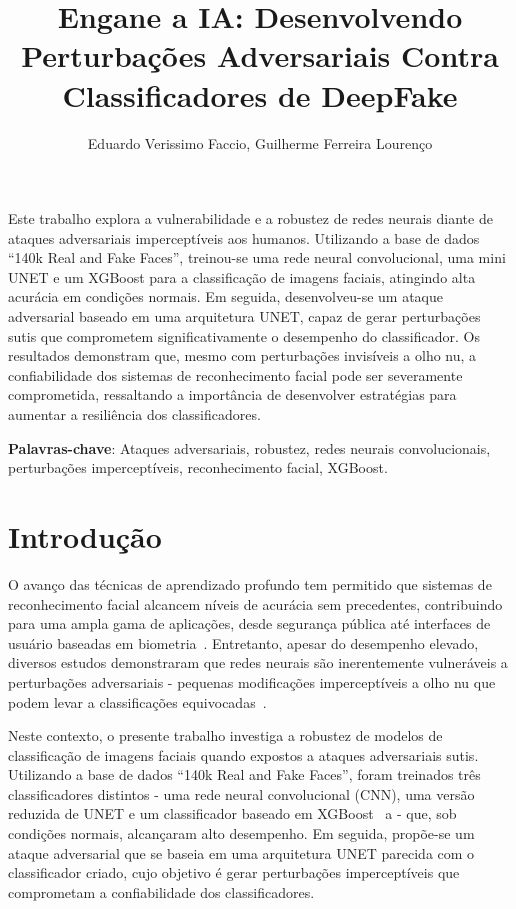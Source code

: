 \documentclass[12pt]{article}
\title{Engane a IA: Desenvolvendo Perturbações Adversariais Contra Classificadores de DeepFake}
\author{Eduardo Verissimo Faccio, Guilherme Ferreira Lourenço}
\begin{document}
\maketitle

\begin{resumo}
    Este trabalho explora a vulnerabilidade e a robustez de redes neurais diante de ataques adversariais
    imperceptíveis aos humanos. Utilizando a base de dados “140k Real and Fake Faces”, treinou-se uma rede
    neural convolucional, uma mini UNET e um XGBoost para a classificação de imagens faciais, atingindo alta
    acurácia em condições normais. Em seguida, desenvolveu-se um ataque adversarial baseado em uma arquitetura
    UNET, capaz de gerar perturbações sutis que comprometem significativamente o desempenho do classificador.
    Os resultados demonstram que, mesmo com perturbações invisíveis a olho nu, a confiabilidade dos sistemas de reconhecimento
    facial pode ser severamente comprometida, ressaltando a importância de desenvolver estratégias para aumentar
    a resiliência dos classificadores.

    \textbf{Palavras-chave}: Ataques adversariais, robustez, redes neurais convolucionais, perturbações imperceptíveis, reconhecimento facial, XGBoost.
\end{resumo}

\section{Introdução}

O avanço das técnicas de aprendizado profundo tem permitido que sistemas de
reconhecimento facial alcancem níveis de acurácia sem precedentes, contribuindo
para uma ampla gama de aplicações, desde segurança pública até interfaces de
usuário baseadas em biometria~\cite{parkhi2015deep}. Entretanto, apesar do
desempenho elevado, diversos estudos demonstraram que redes neurais são
inerentemente vulneráveis a perturbações adversariais - pequenas modificações
imperceptíveis a olho nu que podem levar a classificações
equivocadas~\cite{szegedy2014intriguingpropertiesneuralnetworks,goodfellow2015explainingharnessingadversarialexamples}.

Neste contexto, o presente trabalho investiga a robustez de modelos de
classificação de imagens faciais quando expostos a ataques adversariais sutis.
Utilizando a base de dados ``140k Real and Fake Faces'', foram treinados três
classificadores distintos - uma rede neural convolucional (CNN), uma versão
reduzida de UNET \cite{ronneberger2015u} e um classificador baseado em
XGBoost~\cite{Chen_2016} a - que, sob condições normais, alcançaram alto
desempenho. Em seguida, propõe-se um ataque adversarial que se baseia em uma
arquitetura UNET parecida com o classificador criado, cujo objetivo é gerar
perturbações imperceptíveis que comprometam a confiabilidade dos
classificadores.
\end{document}
